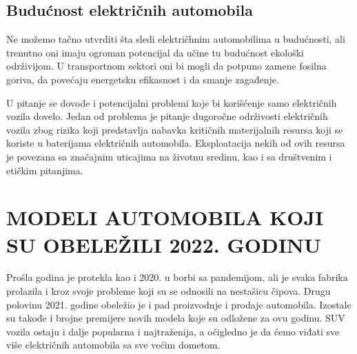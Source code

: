 \documentclass[a4paper]{article}
\begin{document}
\subsection{Budućnost električnih automobila}
\label{subsec:podnaslov3}


Ne možemo tačno utvrditi šta sledi električhnim automobilima u budućnosti, ali trenutno oni imaju ogroman potencijal da učine tu budućnost ekološki održivijom. U transportnom sektori oni bi mogli da potpuno zamene fosilna goriva, da povećaju energetsku efikasnost i da smanje zagađenje.

U pitanje se dovode i potencijalni problemi koje bi korišćenje samo električnih vozila dovelo. Jedan od problema je pitanje dugoročne održivosti električnih vozila zbog rizika koji predstavlja nabavka kritičnih materijalnih resursa koji se koriste u baterijama električnih automobila. Eksploatacija nekih od ovih resursa je povezana sa značajnim uticajima na životnu sredinu, kao i sa društvenim i etičkim pitanjima. 



\section{MODELI AUTOMOBILA KOJI SU OBELEŽILI 2022. GODINU\vspace{2ex}}
\label{sec:MODELI AUTOMOBILA KOJI SU OBELEŽILI 2022. GODINU}

   Prošla godina je protekla kao i 2020. u borbi sa pandemijom, ali je svaka fabrika prolazila i kroz svoje probleme koji su se odnosili na nestašicu čipova. Drugu polovinu 2021. godine obeležio je i pad proizvodnje i prodaje automobila. Izostale su takođe i brojne premijere novih modela koje su odložene za ovu godinu. SUV vozila ostaju i dalje popularna i najtraženija, a očigledno je da ćemo viđati sve više električnih automobila sa sve većim dometom.\\\\
\end{document}
